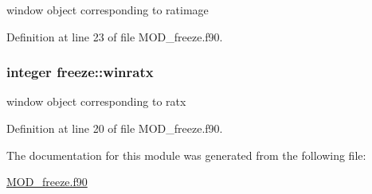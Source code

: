window object corresponding to ratimage 



Definition at line 23 of file M\-O\-D\-\_\-freeze.\-f90.

\hypertarget{classfreeze_aa3149a0168a82518be41d200192edcdb}{
\subsubsection[{winratx}]{\setlength{\rightskip}{0pt plus 5cm}integer freeze\-::winratx}}\label{classfreeze_aa3149a0168a82518be41d200192edcdb}


window object corresponding to ratx 



Definition at line 20 of file M\-O\-D\-\_\-freeze.\-f90.



The documentation for this module was generated from the following file\-:\begin{DoxyCompactItemize}
\item 
\hyperlink{MOD__freeze_8f90}{M\-O\-D\-\_\-freeze.\-f90}\end{DoxyCompactItemize}
